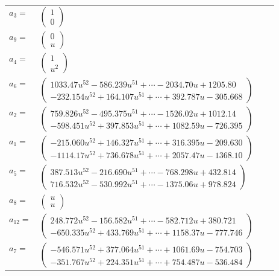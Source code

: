 \documentclass[1p]{elsarticle_modified}
\theoremstyle{definition}
\begin{document}
\begin{tabular}{m{7pt} m{180pt} m{7pt} m{180pt} }
\flushright $a_{3}=$&$\begin{pmatrix}1\\0\end{pmatrix}$ \\
\flushright $a_{9}=$&$\begin{pmatrix}0\\u\end{pmatrix}$ \\
\flushright $a_{4}=$&$\begin{pmatrix}1\\u^2\end{pmatrix}$ \\
\flushright $a_{6}=$&$\begin{pmatrix}1033.47 u^{52}-586.239 u^{51}+\cdots-2034.70 u+1205.80\\-232.154 u^{52}+164.107 u^{51}+\cdots+392.787 u-305.668\end{pmatrix}$ \\
\flushright $a_{2}=$&$\begin{pmatrix}759.826 u^{52}-495.375 u^{51}+\cdots-1526.02 u+1012.14\\-598.451 u^{52}+397.853 u^{51}+\cdots+1082.59 u-726.395\end{pmatrix}$ \\
\flushright $a_{1}=$&$\begin{pmatrix}-215.060 u^{52}+146.327 u^{51}+\cdots+316.395 u-209.630\\-1114.17 u^{52}+736.678 u^{51}+\cdots+2057.47 u-1368.10\end{pmatrix}$ \\
\flushright $a_{5}=$&$\begin{pmatrix}387.513 u^{52}-216.690 u^{51}+\cdots-768.298 u+432.814\\716.532 u^{52}-530.992 u^{51}+\cdots-1375.06 u+978.824\end{pmatrix}$ \\
\flushright $a_{8}=$&$\begin{pmatrix}u\\u\end{pmatrix}$ \\
\flushright $a_{12}=$&$\begin{pmatrix}248.772 u^{52}-156.582 u^{51}+\cdots-582.712 u+380.721\\-650.335 u^{52}+433.769 u^{51}+\cdots+1158.37 u-777.746\end{pmatrix}$ \\
\flushright $a_{7}=$&$\begin{pmatrix}-546.571 u^{52}+377.064 u^{51}+\cdots+1061.69 u-754.703\\-351.767 u^{52}+224.351 u^{51}+\cdots+754.487 u-536.484\end{pmatrix}$ \\

\end{tabular}
\end{document}
